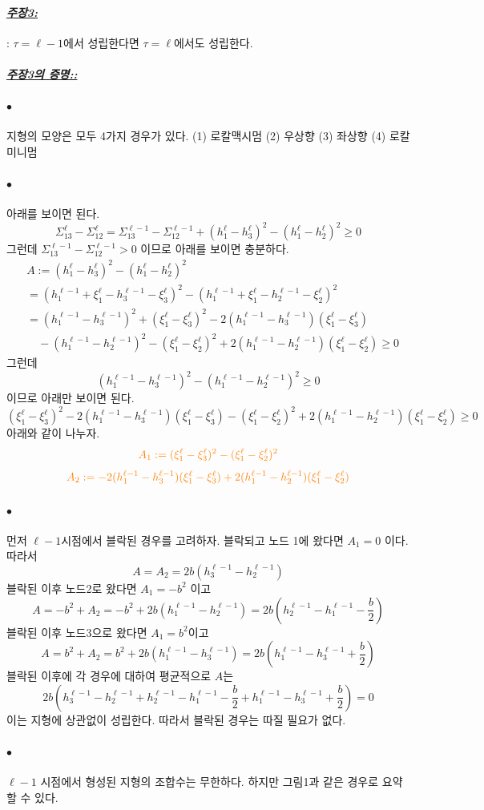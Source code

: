 \documentclass[12pt,oneside,english,a4paper]{article}
\def\ck{\paragraph{\LARGE$\bullet$}\LARGE}
\newcommand{\para}[1]{\paragraph{\LARGE\it\underline{\textbf{#1:}}}\LARGE}
\begin{document}
\para{주장3}: $\tau=\ell-1$에서 성립한다면 $\tau=\ell$에서도 성립한다. 

\para{주장3의 증명:}
\ck 지형의 모양은 모두 4가지 경우가 있다. 
(1) 로칼맥시멈 (2) 우상향 (3) 좌상향 (4) 로칼미니멈 
\ck 아래를 보이면 된다. 
\[
\Sigma_{13}^{\ell}-\Sigma_{12}^{\ell}=\Sigma_{13}^{\ell-1}-\Sigma_{12}^{\ell-1}+(h_{1}^{\ell}-h_3^{\ell})^2-(h_{1}^{\ell}-h_2^{\ell})^2\geq 0
\]
그런데 $\Sigma_{13}^{\ell-1}-\Sigma_{12}^{\ell-1}>0$ 이므로 아래를 보이면 충분하다. 
\begin{align*}
& A:=(h_{1}^{\ell}-h_3^{\ell})^2-(h_{1}^{\ell}-h_2^{\ell})^2 \\
& =(h_1^{\ell-1}+\xi_{1}^{\ell}-h_3^{\ell-1}-\xi_3^{\ell})^2-(h_1^{\ell-1}+\xi_{1}^{\ell}-h_2^{\ell-1}-\xi_2^{\ell})^2 \\ 
& =(h_1^{\ell-1}-h_3^{\ell-1})^2+(\xi_1^{\ell}-\xi_3^{\ell})^2-2(h_1^{\ell-1}-h_3^{\ell-1})(\xi_1^{\ell}-\xi_3^{\ell}) \\
&\quad - (h_1^{\ell-1}-h_2^{\ell-1})^2-(\xi_1^{\ell}-\xi_2^{\ell})^2+2(h_1^{\ell-1}-h_2^{\ell-1})(\xi_1^{\ell}-\xi_2^{\ell})\geq 0
\end{align*}
그런데 
\[
(h_1^{\ell-1}-h_3^{\ell-1})^2-(h_1^{\ell-1}-h_2^{\ell-1})^2 \geq 0 
\]
이므로 아래만 보이면 된다. 
\[
(\xi_1^{\ell}-\xi_3^{\ell})^2-2(h_1^{\ell-1}-h_3^{\ell-1})(\xi_1^{\ell}-\xi_3^{\ell})-(\xi_1^{\ell}-\xi_2^{\ell})^2+2(h_1^{\ell-1}-h_2^{\ell-1})(\xi_1^{\ell}-\xi_2^{\ell})\geq 0
\]
아래와 같이 나누자. 
\[
\textcolor{orange}{A_1:=(\xi_1^{\ell}-\xi_3^{\ell})^2-(\xi_1^{\ell}-\xi_2^{\ell})^2}
\]
\[
\textcolor{orange}{A_2:=-2(h_1^{\ell-1}-h_3^{\ell-1})(\xi_1^{\ell}-\xi_3^{\ell})+2(h_1^{\ell-1}-h_2^{\ell-1})(\xi_1^{\ell}-\xi_2^{\ell})}
\]

\ck 먼저 $\ell-1$시점에서 블락된 경우를 고려하자. 블락되고 노드 1에 왔다면 $A_1=0$ 이다. 따라서
\[
A=A_2=2b\left(h_3^{\ell-1}-h_2^{\ell-1}\right)
\]
블락된 이후 노드2로 왔다면 $A_1=-b^2$ 이고 
\[
A=-b^2+A_2=-b^2+2b(h_1^{\ell-1}-h_2^{\ell-1})=2b\left(h_2^{\ell-1}-h_1^{\ell-1}-\frac{b}{2}\right)
\]
블락된 이후 노드3으로 왔다면 $A_1=b^2$이고 
\[
A=b^2+A_2=b^2+2b(h_1^{\ell-1}-h_3^{\ell-1})=2b\left(h_1^{\ell-1}-h_3^{\ell-1}+\frac{b}{2}\right)
\]
블락된 이후에 각 경우에 대하여 평균적으로 $A$는
\[
2b\left( h_3^{\ell-1}-h_2^{\ell-1}+h_2^{\ell-1}-h_1^{\ell-1}-\frac{b}{2}+h_1^{\ell-1}-h_3^{\ell-1}+\frac{b}{2}\right)=0
\]
이는 지형에 상관없이 성립한다. 따라서 블락된 경우는 따질 필요가 없다. 

\ck $\ell-1$ 시점에서 형성된 지형의 조합수는 무한하다. 하지만 그림1과 같은 경우로 요약할 수 있다. 
\end{document}
